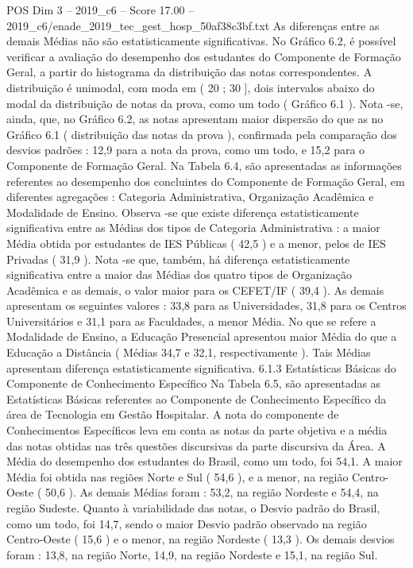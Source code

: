 \begin{textsample}{POS Dim 3 – 2019\_c6 – Score 17.00 – 2019\_c6/enade\_2019\_tec\_gest\_hosp\_50af38c3bf.txt}
As diferenças entre as demais Médias não são estatisticamente significativas.
No Gráfico 6.2, é possível verificar a avaliação do desempenho dos estudantes do Componente de Formação Geral, a partir do histograma da distribuição das notas correspondentes.
A distribuição é unimodal, com moda em ( 20 ; 30 ], dois intervalos abaixo do modal da distribuição de notas da prova, como um todo ( Gráfico 6.1 ).
Nota -se, ainda, que, no Gráfico 6.2, as notas apresentam maior dispersão do que as no Gráfico 6.1 ( distribuição das notas da prova ), confirmada pela comparação dos desvios padrões : 12,9 para a nota da prova, como um todo, e 15,2 para o Componente de Formação Geral.
Na Tabela 6.4, são apresentadas as informações referentes ao desempenho dos concluintes do Componente de Formação Geral, em diferentes agregações : Categoria Administrativa, Organização Acadêmica e Modalidade de Ensino.
Observa -se que existe diferença estatisticamente significativa entre as Médias dos tipos de Categoria Administrativa : a maior Média obtida por estudantes de IES Públicas ( 42,5 ) e a menor, pelos de IES Privadas ( 31,9 ).
Nota -se que, também, há diferença estatisticamente significativa entre a maior das Médias dos quatro tipos de Organização Acadêmica e as demais, o valor maior para os CEFET/IF ( 39,4 ).
As demais apresentam os seguintes valores : 33,8 para as Universidades, 31,8 para os Centros Universitários e 31,1 para as Faculdades, a menor Média.
No que se refere a Modalidade de Ensino, a Educação Presencial apresentou maior Média do que a Educação a Distância ( Médias 34,7 e 32,1, respectivamente ).
Tais Médias apresentam diferença estatisticamente significativa. 6.1.3 Estatísticas Básicas do Componente de Conhecimento Específico Na Tabela 6.5, são apresentadas as Estatísticas Básicas referentes ao Componente de Conhecimento Específico da área de Tecnologia em Gestão Hospitalar.
A nota do componente de Conhecimentos Específicos leva em conta as notas da parte objetiva e a média das notas obtidas nas três questões discursivas da parte discursiva da Área.
A Média do desempenho dos estudantes do Brasil, como um todo, foi 54,1.
A maior Média foi obtida nas regiões Norte e Sul ( 54,6 ), e a menor, na região Centro-Oeste ( 50,6 ).
As demais Médias foram : 53,2, na região Nordeste e 54,4, na região Sudeste.
Quanto à variabilidade das notas, o Desvio padrão do Brasil, como um todo, foi 14,7, sendo o maior Desvio padrão observado na região Centro-Oeste ( 15,6 ) e o menor, na região Nordeste ( 13,3 ).
Os demais desvios foram : 13,8, na região Norte, 14,9, na região Nordeste e 15,1, na região Sul.

\end{textsample}
